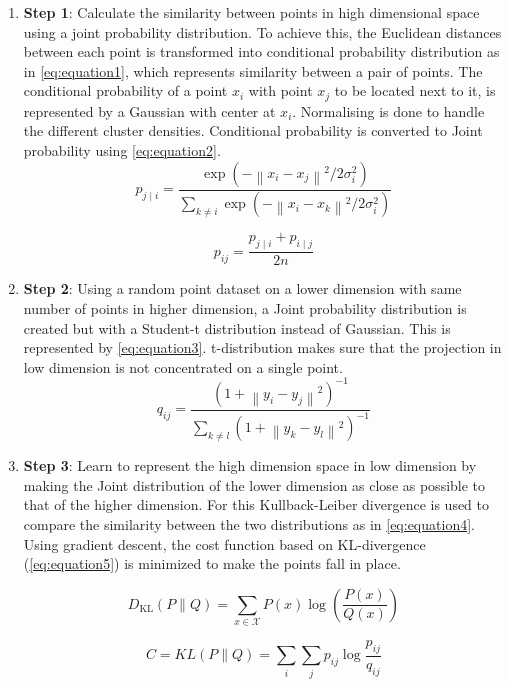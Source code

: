 \begin{enumerate}
    \item \textbf{Step 1}: Calculate the similarity between points in high dimensional space using a joint probability distribution.
        To achieve this, the Euclidean distances between each point is transformed into conditional probability distribution as in \autoref{eq:equation1}, which represents similarity between a pair of points.
        The conditional probability of a point $x_i$ with point $x_j$ to be located next to it, is represented by a Gaussian with center at $x_i$.
        Normalising is done to handle the different cluster densities.
        Conditional probability is converted to Joint probability using \autoref{eq:equation2}.
    \begin{equation}
        p_{j \mid i}=\frac{\exp \left(-\left\|x_{i}-x_{j}\right\|^{2} / 2 \sigma_{i}^{2}\right)}{\sum_{k \neq i} \exp \left(-\left\|x_{i}-x_{k}\right\|^{2} / 2 \sigma_{i}^{2}\right)}
        \label{eq:equation1}
    \end{equation}

    \begin{equation}
        p_{i j}=\frac{p_{j \mid i}+p_{i \mid j}}{2 n}
        \label{eq:equation2}
    \end{equation}

    \item \textbf{Step 2}: Using a random point dataset on a lower dimension with same number of points in higher dimension, a Joint probability distribution is created but with a Student-t distribution instead of Gaussian.
    This is represented by \autoref{eq:equation3}.
    t-distribution makes sure that the projection in low dimension is not concentrated on a single point.
    \begin{equation}
        q_{ij} = \frac{(1+\left \| y_{i}-y_{j} \right \|^{2})^{-1}}{\sum _{k\neq l} (1+\left \| y_{k}-y_{l} \right \|^{2})^{-1}}
        \label{eq:equation3}
    \end{equation}

    \item \textbf{Step 3}: Learn to represent the high dimension space in low dimension by making the Joint distribution of the lower dimension as close as possible to that of the higher dimension.
    For this Kullback-Leiber divergence\cite{Joyce2011} is used to compare the similarity between the two distributions as in \autoref{eq:equation4}.
    Using gradient descent, the cost function based on KL-divergence (\autoref{eq:equation5}) is minimized to make the points fall in place.

    \begin{equation}
        D_{\mathrm{KL}}(P \| Q)=\sum_{x \in \mathcal{X}} P(x) \log \left(\frac{P(x)}{Q(x)}\right)
        \label{eq:equation4}
    \end{equation}

    \begin{equation}
        C=K L(P \| Q)=\sum_{i} \sum_{j} p_{i j} \log \frac{p_{i j}}{q_{i j}}
        \label{eq:equation5}
    \end{equation}
\end{enumerate}

